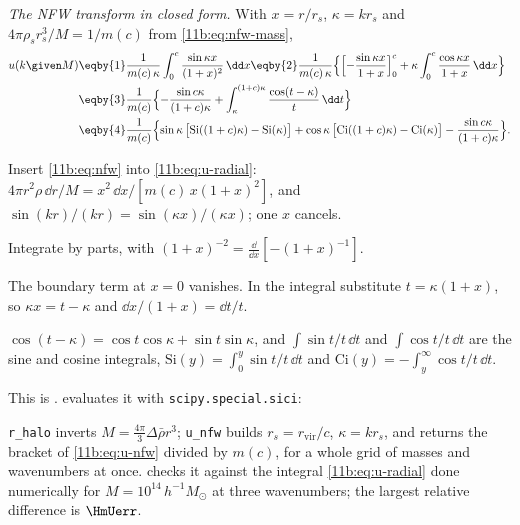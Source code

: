 \emph{The NFW transform in closed form.} With $x=r/r_s$, $\kappa=kr_s$ and
$4\pi\rho_sr_s^3/M=1/m(c)$ from \eqref{11b:eq:nfw-mass},
\begin{align}
  u(k\given M)
  &\eqby{1}\frac{1}{m(c)\,\kappa}\int_0^c\frac{\sin\kappa x}{(1+x)^2}\,\dd x
   \eqby{2}\frac{1}{m(c)\,\kappa}\Bigl\{\Bigl[-\frac{\sin\kappa x}{1+x}\Bigr]_0^c
     +\kappa\int_0^c\frac{\cos\kappa x}{1+x}\,\dd x\Bigr\}\nonumber\\
  &\eqby{3}\frac{1}{m(c)}\Bigl\{-\frac{\sin c\kappa}{(1+c)\kappa}
     +\int_{\kappa}^{(1+c)\kappa}\frac{\cos(t-\kappa)}{t}\,\dd t\Bigr\}\nonumber\\
  &\eqby{4}\frac{1}{m(c)}\Bigl\{\sin\kappa\,\bigl[\mathrm{Si}((1+c)\kappa)-\mathrm{Si}(\kappa)\bigr]
     +\cos\kappa\,\bigl[\mathrm{Ci}((1+c)\kappa)-\mathrm{Ci}(\kappa)\bigr]
     -\frac{\sin c\kappa}{(1+c)\kappa}\Bigr\}.
  \label{11b:eq:u-nfw}
\end{align}
\begin{explain}
  \item Insert \eqref{11b:eq:nfw} into \eqref{11b:eq:u-radial}:
        $4\pi r^2\rho\,\dd r/M=x^2\,\dd x/[m(c)\,x(1+x)^2]$, and
        $\sin(kr)/(kr)=\sin(\kappa x)/(\kappa x)$; one $x$ cancels.
  \item Integrate by parts, with $(1+x)^{-2}=\frac{\dd}{\dd x}[-(1+x)^{-1}]$.
  \item The boundary term at $x=0$ vanishes. In the integral substitute
        $t=\kappa(1+x)$, so $\kappa x=t-\kappa$ and
        $\dd x/(1+x)=\dd t/t$.
  \item $\cos(t-\kappa)=\cos t\cos\kappa+\sin t\sin\kappa$, and
        $\int\sin t/t\,\dd t$ and $\int\cos t/t\,\dd t$ are the sine and cosine
        integrals, $\mathrm{Si}(y)=\int_0^y\sin t/t\,\dd t$ and
        $\mathrm{Ci}(y)=-\int_y^\infty\cos t/t\,\dd t$.
\end{explain}
This is .  evaluates it with
\texttt{scipy.special.sici}:


\noindent
\texttt{r\_halo} inverts $M=\frac{4\pi}{3}\Delta\bar\rho r^3$; \texttt{u\_nfw} builds
$r_s=r_{\mathrm{vir}}/c$, $\kappa=kr_s$, and returns the bracket of
\eqref{11b:eq:u-nfw} divided by $m(c)$, for a whole grid of masses and wavenumbers
at once.  checks it against the integral
\eqref{11b:eq:u-radial} done numerically for $M=10^{14}\,h^{-1}M_\odot$ at three
wavenumbers; the largest relative difference is $\HmUerr$.

